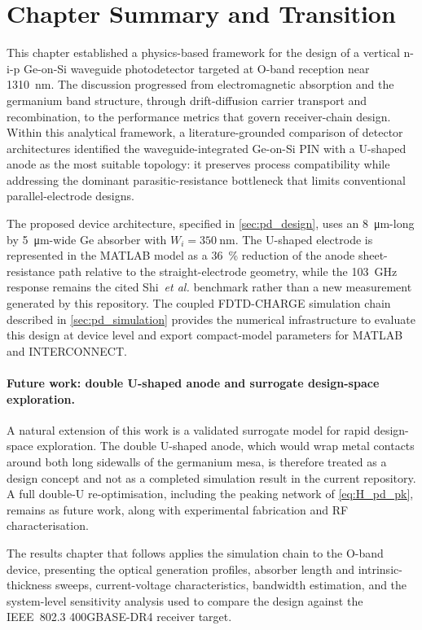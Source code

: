 \section[Chapter Summary]{Chapter Summary and Transition}
\label{sec:pd_summary}

This chapter established a physics-based framework for the design of a vertical
n-i-p Ge-on-Si waveguide photodetector targeted at O-band reception near
\SI{1310}{\nano\metre}. The discussion progressed from electromagnetic absorption
and the germanium band structure, through drift-diffusion carrier transport and
recombination, to the performance metrics that govern receiver-chain design.
Within this analytical framework, a literature-grounded comparison of detector
architectures identified the waveguide-integrated Ge-on-Si PIN with a U-shaped
anode as the most suitable topology: it preserves process compatibility while
addressing the dominant parasitic-resistance bottleneck that limits conventional
parallel-electrode designs.

The proposed device architecture, specified in \cref{sec:pd_design}, uses an
\SI{8}{\micro\metre}-long by \SI{5}{\micro\metre}-wide Ge absorber with
$W_i=\SI{350}{\nano\metre}$. The U-shaped electrode is represented in the MATLAB
model as a \SI{36}{\percent} reduction of the anode sheet-resistance path
relative to the straight-electrode geometry, while the \SI{103}{\giga\hertz}
response remains the cited Shi~\textit{et al.} benchmark rather than a new
measurement generated by this repository. The coupled FDTD-CHARGE simulation
chain described in \cref{sec:pd_simulation} provides the numerical
infrastructure to evaluate this design at device level and export compact-model
parameters for MATLAB and INTERCONNECT.

\paragraph{Future work: double U-shaped anode and surrogate design-space exploration.}
A natural extension of this work is a validated surrogate model for rapid
design-space exploration. The double U-shaped anode, which would wrap metal
contacts around both long sidewalls of the germanium mesa, is therefore treated
as a design concept and not as a completed simulation result in the current
repository. A full double-U re-optimisation, including the peaking network of
\cref{eq:H_pd_pk}, remains as future work, along with experimental fabrication
and RF characterisation.

The results chapter that follows applies the simulation chain to the O-band
device, presenting the optical generation profiles, absorber length and
intrinsic-thickness sweeps, current-voltage characteristics, bandwidth
estimation, and the system-level sensitivity analysis used to compare the design
against the IEEE~802.3 400GBASE-DR4 receiver target.
